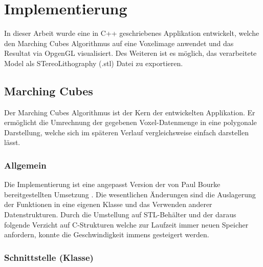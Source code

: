 \chapter{Implementierung}
In dieser Arbeit wurde eine in C++ geschriebenes Applikation entwickelt, welche den Marching Cubes Algorithmus auf eine Voxelimage anwendet und das Resultat via OpgenGL visualisiert. Des Weiteren ist es möglich, das verarbeitete Model als STereoLithography (.stl) Datei zu exportieren.
\section{Marching Cubes}
\label{sec:mcUms}
Der Marching Cubes Algorithmus ist der Kern der entwickelten Applikation. Er ermöglicht die Umrechnung der gegebenen Voxel-Datenmenge in eine polygonale Darstellung, welche sich im späteren Verlauf vergleichsweise einfach darstellen lässt.
\subsection{Allgemein}
Die Implementierung ist eine angepasst Version der von Paul Bourke bereitgestellten Umsetzung \citep{BourkeMC}. Die wesentlichen Änderungen sind die Auslagerung der Funktionen in eine eigenen Klasse und das Verwenden anderer Datenstrukturen. Durch die Umstellung auf STL-Behälter und der daraus folgende Verzicht auf C-Strukturen welche zur Laufzeit immer neuen Speicher anfordern, konnte die Geschwindigkeit immens gesteigert werden.
\subsection{Schnittstelle (Klasse)}

